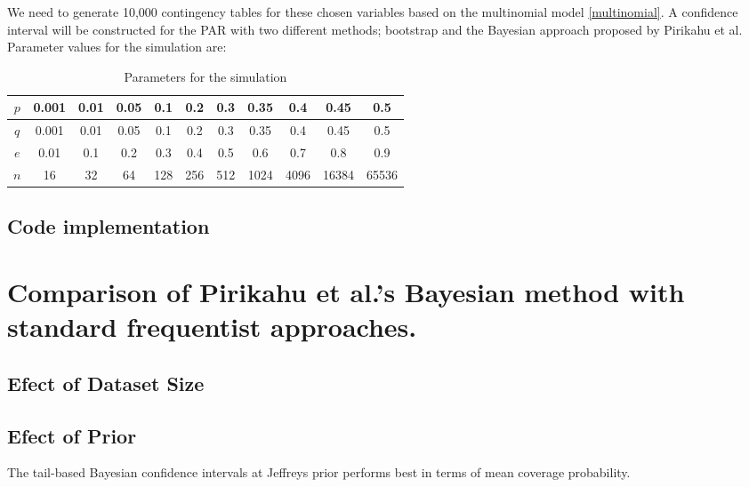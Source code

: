 We need to generate 10,000 contingency tables for these chosen variables based on the multinomial model \ref{multinomial}. A confidence interval will be constructed for the PAR with two different methods; bootstrap and the Bayesian approach proposed by Pirikahu et al. Parameter values for the simulation are:
\begin{table}[h!]
    \centering
    \caption{Parameters for the simulation}
    \label{sample-parameters}
    \begin{tabular}{|c|c|c|c|c|c|c|c|c|c|c|}
    \hline
    $p$ & 0.001 & 0.01  & 0.05 & 0.1  & 0.2  & 0.3  & 0.35 & 0.4  & 0.45  & 0.5   \\ \hline
    $q$ & 0.001 & 0.01  & 0.05 & 0.1  & 0.2  & 0.3  & 0.35 & 0.4  & 0.45  & 0.5   \\ \hline
    $e$ & 0.01  & 0.1   & 0.2  & 0.3  & 0.4  & 0.5  & 0.6  & 0.7  & 0.8   & 0.9   \\ \hline
    $n$ & 16    & 32    & 64   & 128  & 256  & 512  & 1024 & 4096 & 16384 & 65536 \\ \hline
    \end{tabular}
\end{table}

\subsection{Code implementation}
\section{Comparison of Pirikahu et al.'s Bayesian method with standard frequentist approaches.}

\subsection{Efect of Dataset Size}

\subsection{Efect of Prior}
The tail-based Bayesian confidence intervals at Jeffreys prior performs
best in terms of mean coverage probability. \cite{Shi2009BayesianCI} 
